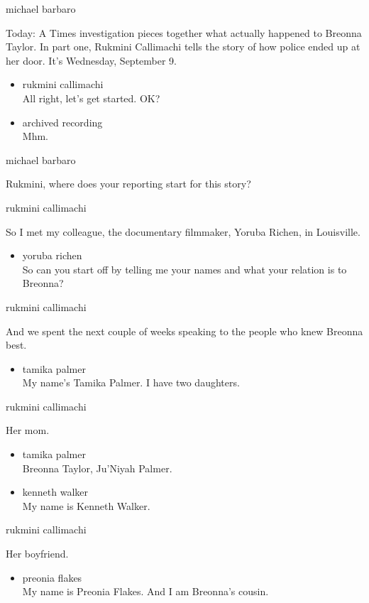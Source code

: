 michael barbaro

Today: A Times investigation pieces together what actually happened to
Breonna Taylor. In part one, Rukmini Callimachi tells the story of how
police ended up at her door. It's Wednesday, September 9.

\begin{itemize}
\item
  rukmini callimachi\\
  All right, let's get started. OK?
\item
  archived recording\\
  Mhm.
\end{itemize}

michael barbaro

Rukmini, where does your reporting start for this story?

rukmini callimachi

So I met my colleague, the documentary filmmaker, Yoruba Richen, in
Louisville.

\begin{itemize}
\tightlist
\item
  yoruba richen\\
  So can you start off by telling me your names and what your relation
  is to Breonna?
\end{itemize}

rukmini callimachi

And we spent the next couple of weeks speaking to the people who knew
Breonna best.

\begin{itemize}
\tightlist
\item
  tamika palmer\\
  My name's Tamika Palmer. I have two daughters.
\end{itemize}

rukmini callimachi

Her mom.

\begin{itemize}
\item
  tamika palmer\\
  Breonna Taylor, Ju'Niyah Palmer.
\item
  kenneth walker\\
  My name is Kenneth Walker.
\end{itemize}

rukmini callimachi

Her boyfriend.

\begin{itemize}
\tightlist
\item
  preonia flakes\\
  My name is Preonia Flakes. And I am Breonna's cousin.
\end{itemize}

